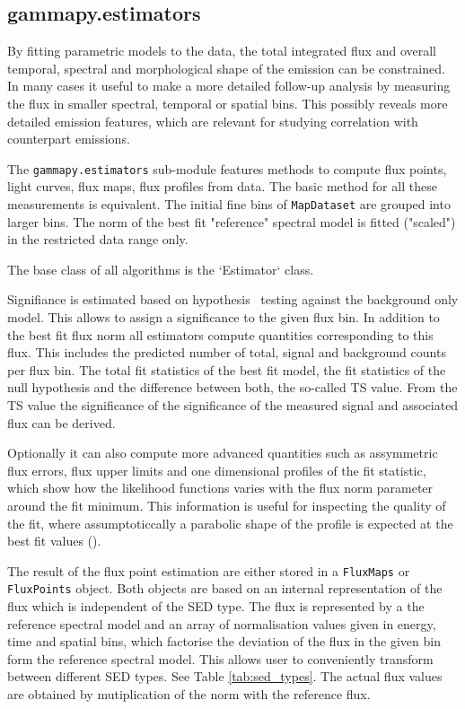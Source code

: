 \subsection{gammapy.estimators}
\label{ssec:gammapy-estimators}
By fitting parametric models to the data, the total integrated
flux and overall temporal, spectral and morphological shape of the
\gammaray emission can be constrained. In many cases it useful
to make a more detailed follow-up analysis by measuring the
flux in smaller spectral, temporal or spatial bins. This
possibly reveals more detailed emission features, which
are relevant for studying correlation with counterpart emissions.

The \verb|gammapy.estimators| sub-module features methods to compute flux
points, light curves, flux maps, flux profiles from data.
The basic method for all these measurements is equivalent.
The initial fine bins of \verb|MapDataset| are grouped into
larger bins. The norm of the best fit "reference" spectral
model is fitted ("scaled") in the  restricted data range only.

The base class of all algorithms is the `Estimator`  class.

Signifiance is estimated based on hypothesis \
testing against the background only model. This allows
to assign a significance to the given flux bin.
In addition to the best fit flux norm all estimators compute
quantities corresponding to this flux. This includes
the predicted number of total, signal and background
counts per flux bin. The total fit statistics
of the best fit model, the fit statistics of the
null hypothesis and the difference between both,
the so-called TS value.
From the TS value the significance of the
significance of the measured signal and associated flux
can be derived.

Optionally it can also compute more advanced quantities
such as assymmetric flux errors, flux upper limits
and one dimensional profiles of the fit statistic,
which show how the likelihood functions varies with
the flux norm parameter around the fit minimum.
This information is useful for inspecting the quality
of the fit, where assumptoticcally a parabolic
shape of the profile is expected at the best fit
values ().

The result of the flux point estimation are either stored in a
\verb|FluxMaps| or \verb|FluxPoints| object. Both objects
are based on an internal representation of the flux which is
independent of the SED type. The flux is represented by a
the reference spectral model and an array of
normalisation values given in energy, time and spatial bins,
which factorise the deviation of the flux in the given
bin form the reference spectral model. This allows
user to conveniently transform between different
SED types. See Table \ref{tab:sed_types}.
The actual flux values are obtained by mutiplication of the norm with the
reference flux.

